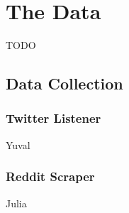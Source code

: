 \section{The Data}

TODO
\subsection{Data Collection}

\subsubsection{Twitter Listener}
Yuval

\subsubsection{Reddit Scraper}
Julia